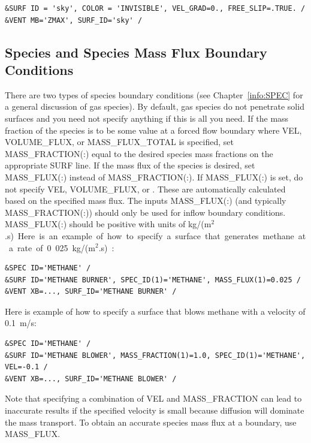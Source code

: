 \documentclass[11pt]{book}
\begin{document}
\begin{lstlisting}
&SURF ID = 'sky', COLOR = 'INVISIBLE', VEL_GRAD=0., FREE_SLIP=.TRUE. /
&VENT MB='ZMAX', SURF_ID='sky' /
\end{lstlisting}


\subsection{Species and Species Mass Flux Boundary Conditions}
\label{info:MASS_FLUX}

There are two types of species boundary conditions (see Chapter~\ref{info:SPEC} for a general discussion of gas species). By default, gas species do not penetrate solid surfaces and you need not specify anything if this is all you need. If the mass fraction of the species is to be some value at a forced flow boundary where {\ct VEL}, {\ct VOLUME\_FLUX}, or {\ct MASS\_FLUX\_TOTAL} is specified, set {\ct MASS\_FRACTION(:)} equal to the desired species mass fractions on the appropriate {\ct SURF} line. If the mass flux of the species is desired, set {\ct MASS\_FLUX(:)} instead of {\ct MASS\_FRACTION(:)}. If {\ct MASS\_FLUX(:)} is set, do not specify {\ct VEL}, {\ct VOLUME\_FLUX}, or . These are automatically calculated based on the specified mass flux. The inputs {\ct MASS\_FLUX(:)} (and typically {\ct MASS\_FRACTION(:)}) should only be used for inflow boundary conditions.  {\ct MASS\_FLUX(:)} should be positive with units of \si{kg/(m$^2$.s)}.

Here is an example of how to specify a surface that generates methane at a rate of 0.025~\si{kg/(m$^2$.s)}:
\begin{lstlisting}
&SPEC ID='METHANE' /
&SURF ID='METHANE BURNER', SPEC_ID(1)='METHANE', MASS_FLUX(1)=0.025 /
&VENT XB=..., SURF_ID='METHANE BURNER' /
\end{lstlisting}
Here is example of how to specify a surface that blows methane with a velocity of 0.1~m/s:
\begin{lstlisting}
&SPEC ID='METHANE' /
&SURF ID='METHANE BLOWER', MASS_FRACTION(1)=1.0, SPEC_ID(1)='METHANE', VEL=-0.1 /
&VENT XB=..., SURF_ID='METHANE BLOWER' /
\end{lstlisting}
Note that specifying a combination of {\ct VEL} and {\ct MASS\_FRACTION} can lead to inaccurate results if the specified velocity is small because diffusion will dominate the mass transport.  To obtain an accurate species mass flux at a boundary, use {\ct MASS\_FLUX}.
\end{document}
